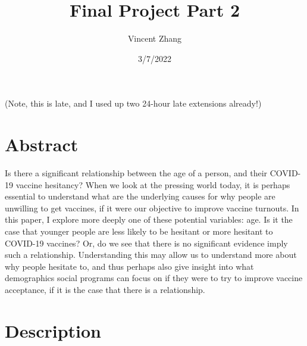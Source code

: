 \documentclass[
]{article}
\title{Final Project Part 2}
\author{Vincent Zhang}
\date{3/7/2022}
\begin{document}
\maketitle

(Note, this is late, and I used up two 24-hour late extensions already!)

\hypertarget{abstract}{%
\section{Abstract}\label{abstract}}

Is there a significant relationship between the age of a person, and
their COVID-19 vaccine hesitancy? When we look at the pressing world
today, it is perhaps essential to understand what are the underlying
causes for why people are unwilling to get vaccines, if it were our
objective to improve vaccine turnouts. In this paper, I explore more
deeply one of these potential variables: age. Is it the case that
younger people are less likely to be hesitant or more hesitant to
COVID-19 vaccines? Or, do we see that there is no significant evidence
imply such a relationship. Understanding this may allow us to understand
more about why people hesitate to, and thus perhaps also give insight
into what demographics social programs can focus on if they were to try
to improve vaccine acceptance, if it is the case that there is a
relationship.

\hypertarget{description}{%
\section{Description}\label{description}}
\end{document}
